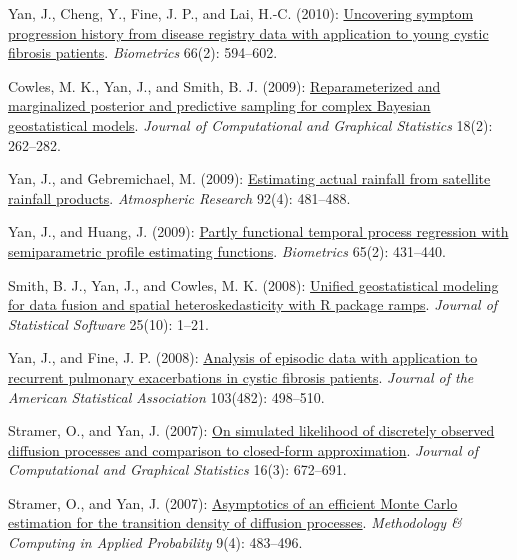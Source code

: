 \begin{RefereedJournalArticles}
\item Yan, J., Cheng, Y., Fine, J. P., and Lai, H.-C. (2010):
\href{https://doi.org/10.1111/j.1541-0420.2009.01288.x}{Uncovering
symptom progression history from disease registry data with application
to young cystic fibrosis patients}. \emph{Biometrics} 66(2): 594--602.

\item Cowles, M. K., Yan, J., and Smith, B. J. (2009):
\href{https://doi.org/10.1198/jcgs.2009.08012}{Reparameterized and
marginalized posterior and predictive sampling for complex Bayesian
geostatistical models}. \emph{Journal of Computational and Graphical
Statistics} 18(2): 262--282.

\item Yan, J., and Gebremichael, M. (2009):
\href{https://doi.org/10.1016/j.atmosres.2009.02.004}{Estimating actual
rainfall from satellite rainfall products}. \emph{Atmospheric Research}
92(4): 481--488.

\item Yan, J., and Huang, J. (2009):
\href{https://doi.org/10.1111/j.1541-0420.2008.01071.x}{Partly
functional temporal process regression with semiparametric profile
estimating functions}. \emph{Biometrics} 65(2): 431--440.

\item Smith, B. J., Yan, J., and Cowles, M. K. (2008):
\href{https://doi.org/10.18637/jss.v025.i10}{Unified geostatistical
modeling for data fusion and spatial heteroskedasticity with R package
ramps}. \emph{Journal of Statistical Software} 25(10): 1--21.

\item Yan, J., and Fine, J. P. (2008):
\href{https://doi.org/10.1198/016214507000000482}{Analysis of episodic
data with application to recurrent pulmonary exacerbations in cystic
fibrosis patients}. \emph{Journal of the American Statistical
Association} 103(482): 498--510.

\item Stramer, O., and Yan, J. (2007):
\href{https://doi.org/10.1198/106186007x237306}{On simulated likelihood
of discretely observed diffusion processes and comparison to closed-form
approximation}. \emph{Journal of Computational and Graphical Statistics}
16(3): 672--691.

\item Stramer, O., and Yan, J. (2007):
\href{https://doi.org/10.1007/s11009-006-9006-2}{Asymptotics of an
efficient Monte Carlo estimation for the transition density of diffusion
processes}. \emph{Methodology \& Computing in Applied Probability} 9(4):
483--496.


\end{RefereedJournalArticles}
